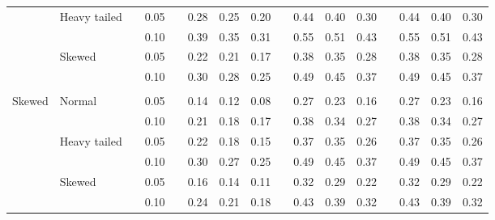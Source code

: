 \documentclass{article} %
\begin{document}
\begin{table}[ht]
\begin{scriptsize}
\begin{center}
\begin{tabular}{ll p{.1cm} c p{.1cm} rrr p{.1cm} rrr p{.1cm} rrr}
             & Heavy tailed && 0.05 &&   0.28 & 0.25 & 0.20 && 0.44 & 0.40 & 0.30 && 0.44 & 0.40 & 0.30 \\ 
             &              && 0.10 &&   0.39 & 0.35 & 0.31 && 0.55 & 0.51 & 0.43 && 0.55 & 0.51 & 0.43 \\ 
             & Skewed       && 0.05 &&   0.22 & 0.21 & 0.17 && 0.38 & 0.35 & 0.28 && 0.38 & 0.35 & 0.28 \\ 
             &              && 0.10 &&   0.30 & 0.28 & 0.25 && 0.49 & 0.45 & 0.37 && 0.49 & 0.45 & 0.37 \\ 
             &&&&&&&&&&&&&&&\\
Skewed       & Normal       && 0.05 &&   0.14 & 0.12 & 0.08 && 0.27 & 0.23 & 0.16 && 0.27 & 0.23 & 0.16 \\ 
             &              && 0.10 &&   0.21 & 0.18 & 0.17 && 0.38 & 0.34 & 0.27 && 0.38 & 0.34 & 0.27 \\ 
             & Heavy tailed && 0.05 &&   0.22 & 0.18 & 0.15 && 0.37 & 0.35 & 0.26 && 0.37 & 0.35 & 0.26 \\ 
             &              && 0.10 &&   0.30 & 0.27 & 0.25 && 0.49 & 0.45 & 0.37 && 0.49 & 0.45 & 0.37 \\ 
             & Skewed       && 0.05 &&   0.16 & 0.14 & 0.11 && 0.32 & 0.29 & 0.22 && 0.32 & 0.29 & 0.22 \\ 
             &              && 0.10 &&   0.24 & 0.21 & 0.18 && 0.43 & 0.39 & 0.32 && 0.43 & 0.39 & 0.32 \\ 



\end{tabular}
\end{center}
\end{scriptsize}
\end{table}
\end{document}
